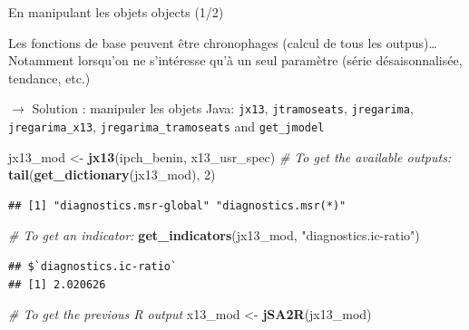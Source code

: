 \documentclass[10pt,xcolor=table,color={dvipsnames,usenames},ignorenonframetext,usepdftitle=false,french]{beamer}
\newenvironment{Shaded}{\begin{snugshade}}{\end{snugshade}}
\newcommand{\CommentTok}[1]{\textcolor[rgb]{0.56,0.35,0.01}{\textit{#1}}}
\newcommand{\DecValTok}[1]{\textcolor[rgb]{0.00,0.00,0.81}{#1}}
\newcommand{\KeywordTok}[1]{\textcolor[rgb]{0.13,0.29,0.53}{\textbf{#1}}}
\newcommand{\NormalTok}[1]{#1}
\newcommand{\StringTok}[1]{\textcolor[rgb]{0.31,0.60,0.02}{#1}}
\begin{document}
\begin{frame}[fragile]{En manipulant les objets \faJava{} objects (1/2)}
\protect\hypertarget{en-manipulant-les-objets-objects-12}{}

\footnotesize

Les fonctions de base peuvent être chronophages (calcul de tous les
outpus)\ldots{} Notamment lorsqu'on ne s'intéresse qu'à un seul
paramètre (série désaisonnalisée, tendance, etc.)

\(\rightarrow\) Solution : manipuler les objets Java: \texttt{jx13},
\texttt{jtramoseats}, \texttt{jregarima}, \texttt{jregarima\_x13},
\texttt{jregarima\_tramoseats} and \texttt{get\_jmodel}

\medskip
\pause

\begin{Shaded}
\begin{Highlighting}[]
\NormalTok{jx13_mod <-}\StringTok{ }\KeywordTok{jx13}\NormalTok{(ipch_benin, x13_usr_spec)}
\CommentTok{# To get the available outputs:}
\KeywordTok{tail}\NormalTok{(}\KeywordTok{get_dictionary}\NormalTok{(jx13_mod), }\DecValTok{2}\NormalTok{)}
\end{Highlighting}
\end{Shaded}

\begin{verbatim}
## [1] "diagnostics.msr-global" "diagnostics.msr(*)"
\end{verbatim}

\begin{Shaded}
\begin{Highlighting}[]
\CommentTok{# To get an indicator:}
\KeywordTok{get_indicators}\NormalTok{(jx13_mod, }\StringTok{"diagnostics.ic-ratio"}\NormalTok{)}
\end{Highlighting}
\end{Shaded}

\begin{verbatim}
## $`diagnostics.ic-ratio`
## [1] 2.020626
\end{verbatim}

\begin{Shaded}
\begin{Highlighting}[]
\CommentTok{# To get the previous R output}
\NormalTok{x13_mod <-}\StringTok{ }\KeywordTok{jSA2R}\NormalTok{(jx13_mod)}
\end{Highlighting}
\end{Shaded}

\end{frame}
\end{document}
